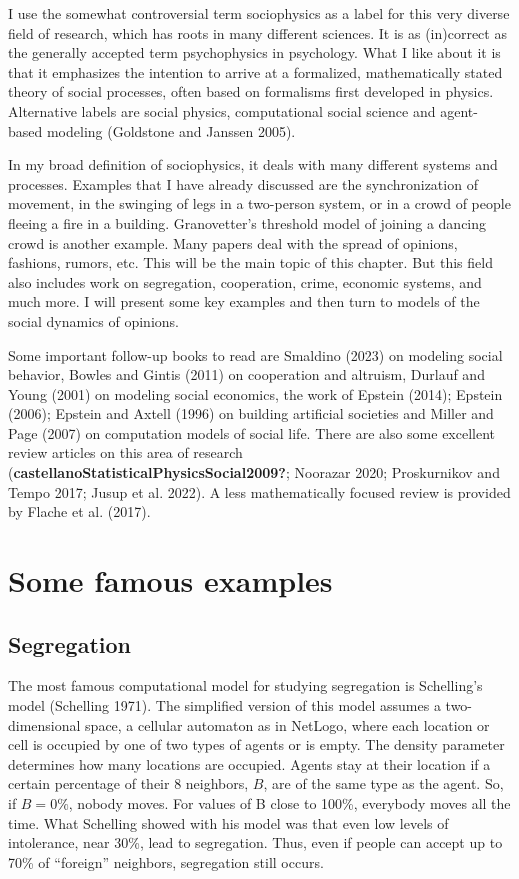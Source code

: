 \documentclass[
  a4paper,
  DIV=11,
  numbers=noendperiod]{scrreprt}
\begin{document}
I use the somewhat controversial term sociophysics as a label for this
very diverse field of research, which has roots in many different
sciences. It is as (in)correct as the generally accepted term
psychophysics in psychology. What I like about it is that it emphasizes
the intention to arrive at a formalized, mathematically stated theory of
social processes, often based on formalisms first developed in physics.
Alternative labels are social physics, computational social science and
agent-based modeling (Goldstone and Janssen 2005).

In my broad definition of sociophysics, it deals with many different
systems and processes. Examples that I have already discussed are the
synchronization of movement, in the swinging of legs in a two-person
system, or in a crowd of people fleeing a fire in a building.
Granovetter's threshold model of joining a dancing crowd is another
example. Many papers deal with the spread of opinions, fashions, rumors,
etc. This will be the main topic of this chapter. But this field also
includes work on segregation, cooperation, crime, economic systems, and
much more. I will present some key examples and then turn to models of
the social dynamics of opinions.

Some important follow-up books to read are Smaldino (2023) on modeling
social behavior, Bowles and Gintis (2011) on cooperation and altruism,
Durlauf and Young (2001) on modeling social economics, the work of
Epstein (2014); Epstein (2006); Epstein and Axtell (1996) on building
artificial societies and Miller and Page (2007) on computation models of
social life. There are also some excellent review articles on this area
of research (\textbf{castellanoStatisticalPhysicsSocial2009?}; Noorazar
2020; Proskurnikov and Tempo 2017; Jusup et al. 2022). A less
mathematically focused review is provided by Flache et al. (2017).

\hypertarget{sec-Some-famous-examples}{%
\section{Some famous examples}\label{sec-Some-famous-examples}}

\hypertarget{sec-Segregation}{%
\subsection{Segregation}\label{sec-Segregation}}

The most famous computational model for studying segregation is
Schelling's model (Schelling 1971). The simplified version of this model
assumes a two-dimensional space, a cellular automaton as in NetLogo,
where each location or cell is occupied by one of two types of agents or
is empty. The density parameter determines how many locations are
occupied. Agents stay at their location if a certain percentage of their
8 neighbors, \(B\), are of the same type as the agent. So, if
\(B = 0\%\), nobody moves. For values of B close to 100\%, everybody
moves all the time. What Schelling showed with his model was that even
low levels of intolerance, near 30\%, lead to segregation. Thus, even if
people can accept up to 70\% of ``foreign'' neighbors, segregation still
occurs.
\end{document}
